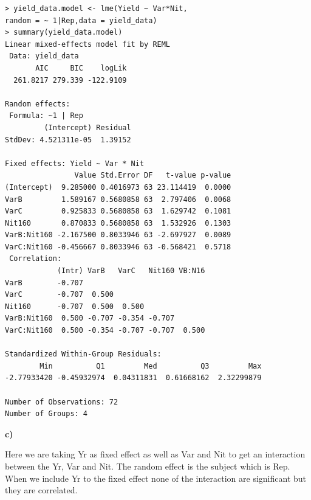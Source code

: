 \documentclass[12pt,letterpaper]{article}
\begin{document}
\begin{lstlisting}[label=R Code,caption=Q5(b) R Code Output]
> yield_data.model <- lme(Yield ~ Var*Nit,
random = ~ 1|Rep,data = yield_data)
> summary(yield_data.model)
Linear mixed-effects model fit by REML
 Data: yield_data 
       AIC     BIC    logLik
  261.8217 279.339 -122.9109

Random effects:
 Formula: ~1 | Rep
         (Intercept) Residual
StdDev: 4.521311e-05  1.39152

Fixed effects: Yield ~ Var * Nit 
                Value Std.Error DF   t-value p-value
(Intercept)  9.285000 0.4016973 63 23.114419  0.0000
VarB         1.589167 0.5680858 63  2.797406  0.0068
VarC         0.925833 0.5680858 63  1.629742  0.1081
Nit160       0.870833 0.5680858 63  1.532926  0.1303
VarB:Nit160 -2.167500 0.8033946 63 -2.697927  0.0089
VarC:Nit160 -0.456667 0.8033946 63 -0.568421  0.5718
 Correlation: 
            (Intr) VarB   VarC   Nit160 VB:N16
VarB        -0.707                            
VarC        -0.707  0.500                     
Nit160      -0.707  0.500  0.500              
VarB:Nit160  0.500 -0.707 -0.354 -0.707       
VarC:Nit160  0.500 -0.354 -0.707 -0.707  0.500

Standardized Within-Group Residuals:
        Min          Q1         Med          Q3         Max 
-2.77933420 -0.45932974  0.04311831  0.61668162  2.32299879 

Number of Observations: 72
Number of Groups: 4 
\end{lstlisting}

\textbf{{c)}}

Here we are taking Yr as fixed effect as well as Var and Nit to get an interaction between the Yr, Var and Nit.
The random effect is the subject which is Rep.
When we include Yr to the fixed effect none of the interaction are significant but they are correlated. 
\end{document}
